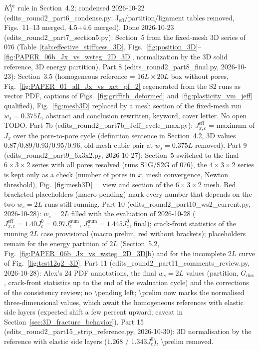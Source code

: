 \documentclass[pdflatex,sn-mathphys-num]{sn-jnl}%
\theoremstyle{thmstyleone}%
\theoremstyle{thmstyletwo}%
\theoremstyle{thmstylethree}%
\begin{document}
{$K_I^{\text{bc}}$ rule in Section~4.2; condensed 2026-10-22 (edits\_round2\_part6\_condense.py: J$_{\text{eff}}$/partition/ligament tables removed, Figs.~11--13 merged, 4.5+4.6 merged). Done 2026-10-23 (edits\_round2\_part7\_section5.py): Section~5 from the fixed-mesh 3D series of 076 (Table~\ref{tab:effective_stiffness_3D}, Figs.~\ref{fig:position_3D}--\ref{fig:PAPER_06b_Jx_vs_wsteg_2D_3D}, normalization by the 3D solid reference, 3D energy partition). Part 8 (edits\_round2\_part8\_final.py, 2026-10-23): Section~3.5 (homogeneous reference = $16L \times 20L$ box without pores, Fig.~\ref{fig:PAPER_01_all_Jx_vs_xct_pf_2} regenerated from the S2 runs as vector PDF, captions of Figs.~\ref{fig:griffith_deformed} and~\ref{fig:plasticity_vm_jeff} qualified), Fig.~\ref{fig:mesh3D} replaced by a mesh section of the fixed-mesh run $w_s = 0.375L$, abstract and conclusion rewritten, keyword, cover letter. No open TODO. Part 7b (edits\_round2\_part7b\_Jeff\_cycle\_max.py): $J_{x,c}^{\text{eff}}$ = maximum of $J_x$ over the pore-to-pore cycle (definition sentence in Section~4.2, 3D values 0.87/0.89/0.93/0.95/0.96, old-mesh cubic pair at $w_s = 0.375L$ removed). Part 9 (edits\_round2\_part9\_6x3x2.py, 2026-10-27): Section~5 switched to the final $6 \times 3 \times 2$ series with all pores resolved (runs S1G/S2G of 076), the $4 \times 3 \times 2$ series is kept only as a check (number of pores in $x$, mesh convergence, Newton threshold), Fig.~\ref{fig:mesh3D} = view and section of the $6 \times 3 \times 2$ mesh. Red bracketed placeholders (macro pending) mark every number that depends on the two $w_s = 2L$ runs still running. Part 10 (edits\_round2\_part10\_ws2\_current.py, 2026-10-28): $w_s = 2L$ filled with the evaluation of 2026-10-28 ($J_{x,c}^{\text{eff}} = 1.40J_c^0 = 0.97J_c^{\text{num}}$, $J_c^{\text{num}} = 1.445J_c^0$, final); crack-front statistics of the running $2L$ case provisional (macro prelim, red without brackets); placeholders remain for the energy partition of $2L$ (Section~5.2, Fig.~\ref{fig:PAPER_06b_Jx_vs_wsteg_2D_3D}b) and for the incomplete $2L$ curve of Fig.~\ref{fig:test12q2_3D}. Part 11 (edits\_round2\_part11\_comments\_review.py, 2026-10-28): Alex's 24 PDF annotations, the final $w_s = 2L$ values (partition, $G_{\text{diss}}$, crack-front statistics up to the end of the evaluation cycle) and the corrections of the consistency review; no \textbackslash pending left; \textbackslash prelim now marks the normalised three-dimensional values, which await the homogeneous references with elastic side layers (expected shift a few percent upward; caveat in Section~\ref{sec:3D_fracture_behavior}). Part 15 (edits\_round2\_part15\_strip\_reference.py, 2026-10-30): 3D normalisation by the reference with elastic side layers ($1.268$ / $1.343J_c^0$), \textbackslash prelim removed.}
\end{document}
